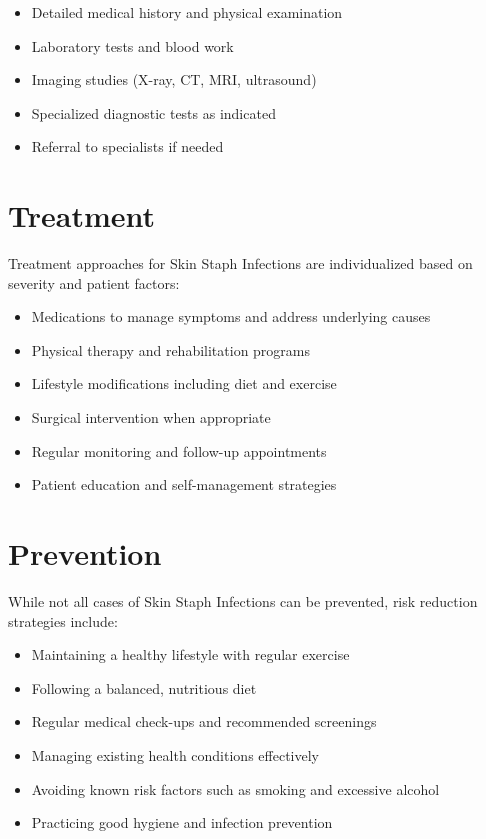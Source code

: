 \begin{itemize}
\item Detailed medical history and physical examination
\item Laboratory tests and blood work
\item Imaging studies (X-ray, CT, MRI, ultrasound)
\item Specialized diagnostic tests as indicated
\item Referral to specialists if needed
\end{itemize}

\section*{Treatment}
Treatment approaches for Skin Staph Infections are individualized based on severity and patient factors:

\begin{itemize}
\item Medications to manage symptoms and address underlying causes
\item Physical therapy and rehabilitation programs
\item Lifestyle modifications including diet and exercise
\item Surgical intervention when appropriate
\item Regular monitoring and follow-up appointments
\item Patient education and self-management strategies
\end{itemize}

\section*{Prevention}
While not all cases of Skin Staph Infections can be prevented, risk reduction strategies include:

\begin{itemize}
\item Maintaining a healthy lifestyle with regular exercise
\item Following a balanced, nutritious diet
\item Regular medical check-ups and recommended screenings
\item Managing existing health conditions effectively
\item Avoiding known risk factors such as smoking and excessive alcohol
\item Practicing good hygiene and infection prevention
\end{itemize}

